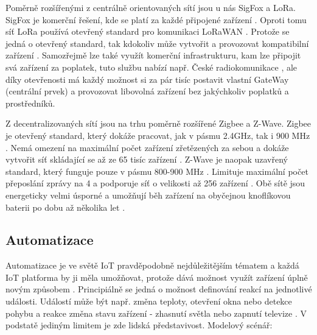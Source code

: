 Poměrně rozšířenými z centrálně orientovaných sítí jsou u nás SigFox a LoRa. SigFox je komerční řešení, kde se platí za každé připojené zařízení \cite{sigfox-price}. Oproti tomu síť LoRa používá otevřený standard pro komunikaci LoRaWAN \cite{lora}. Protože se jedná o otevřený standard, tak kdokoliv může vytvořit a provozovat kompatibilní zařízení \cite{lora}. Samozřejmě lze také využít komerční infrastrukturu, kam lze připojit svá zařízení za poplatek, tuto službu nabízí např. České radiokomunikace \cite{cra}, ale díky otevřenosti má každý možnost si za pár tisíc postavit vlastní GateWay (centrální prvek) a provozovat libovolná zařízení bez jakýchkoliv poplatků a prostředníků.

Z decentralizovaných sítí jsou na trhu poměrně rozšířené Zigbee a Z-Wave. Zigbee je otevřený standard, který dokáže pracovat, jak v pásmu 2.4GHz, tak i 900 MHz \cite{zigbee}. Nemá omezení na maximální počet zařízení zřetězených za sebou a dokáže vytvořit síť skládající se až ze 65 tisíc zařízení \cite{zigbee}. Z-Wave je naopak uzavřený standard, který funguje pouze v pásmu 800-900 MHz \cite{zwave}. Limituje maximální počet přeposlání zprávy na 4 a podporuje síť o velikosti až 256 zařízení \cite{zwave}. Obě sítě jsou energeticky velmi úsporné a umožňují běh zařízení na obyčejnou knoflíkovou baterii po dobu až několika let \cite{zigbee, zwave}.

\subsection{Automatizace}
Automatizace je ve světě IoT pravděpodobně nejdůležitějším tématem a každá IoT platforma by ji měla umožňovat, protože dává možnost využít zařízení úplně novým způsobem \cite{what-future-hold}. Principiálně se jedná o možnost definování reakcí na jednotlivé události. Událostí může být např. změna teploty, otevření okna nebo detekce pohybu a reakce změna stavu zařízení - zhasnutí světla nebo zapnutí televize \cite{what-future-hold}. V podstatě jediným limitem je zde lidská představivost. Modelový scénář:

